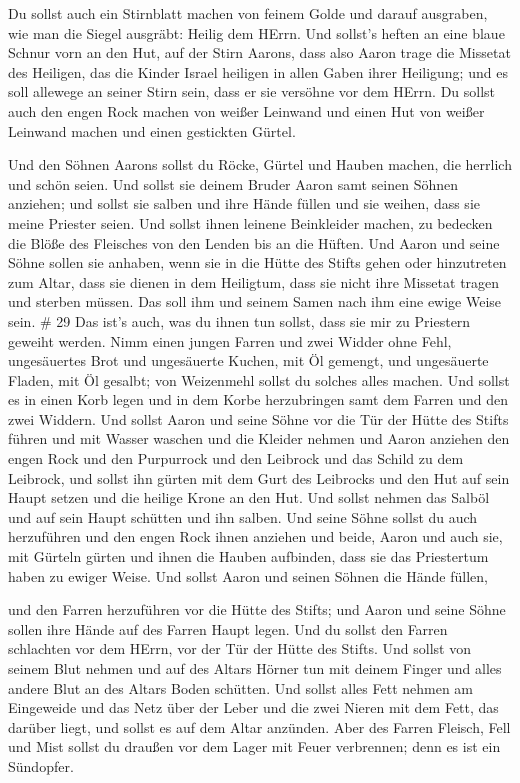  Du sollst auch ein Stirnblatt machen von feinem Golde und
darauf ausgraben, wie man die Siegel ausgräbt: Heilig dem HErrn.
 Und sollst's heften an eine blaue Schnur vorn an den Hut,
 auf der Stirn Aarons, dass also Aaron trage die Missetat
des Heiligen, das die Kinder Israel heiligen in allen Gaben ihrer
Heiligung; und es soll allewege an seiner Stirn sein, dass er sie
versöhne vor dem HErrn.  Du sollst auch den engen Rock
machen von weißer Leinwand und einen Hut von weißer Leinwand machen und
einen gestickten Gürtel.

 Und den Söhnen Aarons sollst du Röcke, Gürtel und Hauben
machen, die herrlich und schön seien.  Und sollst sie
deinem Bruder Aaron samt seinen Söhnen anziehen; und sollst sie salben
und ihre Hände füllen und sie weihen, dass sie meine Priester seien.
 Und sollst ihnen leinene Beinkleider machen, zu bedecken
die Blöße des Fleisches von den Lenden bis an die Hüften. 
Und Aaron und seine Söhne sollen sie anhaben, wenn sie in die Hütte des
Stifts gehen oder hinzutreten zum Altar, dass sie dienen in dem
Heiligtum, dass sie nicht ihre Missetat tragen und sterben müssen. Das
soll ihm und seinem Samen nach ihm eine ewige Weise sein. \# 29
 Das ist's auch, was du ihnen tun sollst, dass sie mir zu
Priestern geweiht werden. Nimm einen jungen Farren und zwei Widder ohne
Fehl,  ungesäuertes Brot und ungesäuerte Kuchen, mit Öl
gemengt, und ungesäuerte Fladen, mit Öl gesalbt; von Weizenmehl sollst
du solches alles machen.  Und sollst es in einen Korb legen
und in dem Korbe herzubringen samt dem Farren und den zwei Widdern.
 Und sollst Aaron und seine Söhne vor die Tür der Hütte des
Stifts führen und mit Wasser waschen  und die Kleider nehmen
und Aaron anziehen den engen Rock und den Purpurrock und den Leibrock
und das Schild zu dem Leibrock, und sollst ihn gürten mit dem Gurt des
Leibrocks  und den Hut auf sein Haupt setzen und die heilige
Krone an den Hut.  Und sollst nehmen das Salböl und auf sein
Haupt schütten und ihn salben.  Und seine Söhne sollst du
auch herzuführen und den engen Rock ihnen anziehen  und
beide, Aaron und auch sie, mit Gürteln gürten und ihnen die Hauben
aufbinden, dass sie das Priestertum haben zu ewiger Weise. Und sollst
Aaron und seinen Söhnen die Hände füllen,

 und den Farren herzuführen vor die Hütte des Stifts; und
Aaron und seine Söhne sollen ihre Hände auf des Farren Haupt legen.
 Und du sollst den Farren schlachten vor dem HErrn, vor der
Tür der Hütte des Stifts.  Und sollst von seinem Blut
nehmen und auf des Altars Hörner tun mit deinem Finger und alles andere
Blut an des Altars Boden schütten.  Und sollst alles Fett
nehmen am Eingeweide und das Netz über der Leber und die zwei Nieren mit
dem Fett, das darüber liegt, und sollst es auf dem Altar anzünden.
 Aber des Farren Fleisch, Fell und Mist sollst du draußen
vor dem Lager mit Feuer verbrennen; denn es ist ein Sündopfer.

